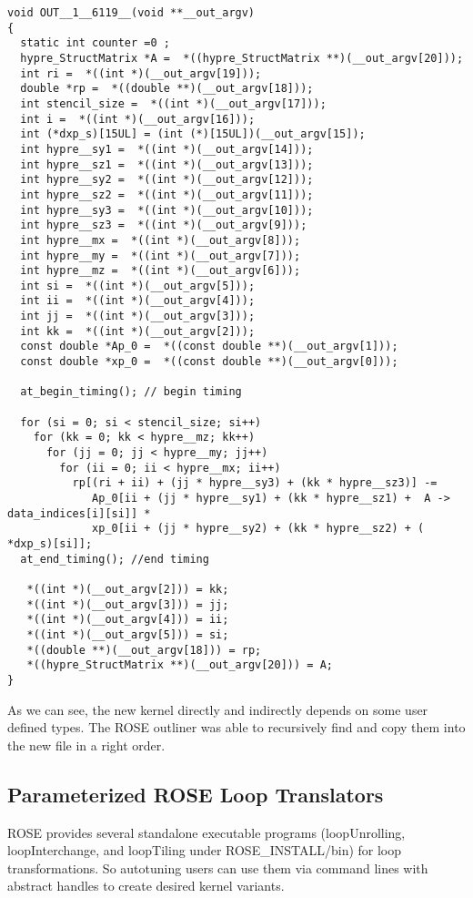 \begin{lstlisting}
void OUT__1__6119__(void **__out_argv)
{
  static int counter =0 ;
  hypre_StructMatrix *A =  *((hypre_StructMatrix **)(__out_argv[20]));
  int ri =  *((int *)(__out_argv[19]));
  double *rp =  *((double **)(__out_argv[18]));
  int stencil_size =  *((int *)(__out_argv[17]));
  int i =  *((int *)(__out_argv[16]));
  int (*dxp_s)[15UL] = (int (*)[15UL])(__out_argv[15]);
  int hypre__sy1 =  *((int *)(__out_argv[14]));
  int hypre__sz1 =  *((int *)(__out_argv[13]));
  int hypre__sy2 =  *((int *)(__out_argv[12]));
  int hypre__sz2 =  *((int *)(__out_argv[11]));
  int hypre__sy3 =  *((int *)(__out_argv[10]));
  int hypre__sz3 =  *((int *)(__out_argv[9]));
  int hypre__mx =  *((int *)(__out_argv[8]));
  int hypre__my =  *((int *)(__out_argv[7]));
  int hypre__mz =  *((int *)(__out_argv[6]));
  int si =  *((int *)(__out_argv[5]));
  int ii =  *((int *)(__out_argv[4]));
  int jj =  *((int *)(__out_argv[3]));
  int kk =  *((int *)(__out_argv[2]));
  const double *Ap_0 =  *((const double **)(__out_argv[1]));
  const double *xp_0 =  *((const double **)(__out_argv[0]));

  at_begin_timing(); // begin timing

  for (si = 0; si < stencil_size; si++)
    for (kk = 0; kk < hypre__mz; kk++)
      for (jj = 0; jj < hypre__my; jj++)
        for (ii = 0; ii < hypre__mx; ii++)
          rp[(ri + ii) + (jj * hypre__sy3) + (kk * hypre__sz3)] -= 
             Ap_0[ii + (jj * hypre__sy1) + (kk * hypre__sz1) +  A -> data_indices[i][si]] *
             xp_0[ii + (jj * hypre__sy2) + (kk * hypre__sz2) + ( *dxp_s)[si]];
  at_end_timing(); //end timing

   *((int *)(__out_argv[2])) = kk;
   *((int *)(__out_argv[3])) = jj;
   *((int *)(__out_argv[4])) = ii;
   *((int *)(__out_argv[5])) = si;
   *((double **)(__out_argv[18])) = rp;
   *((hypre_StructMatrix **)(__out_argv[20])) = A;
}

\end{lstlisting}

As we can see, the new kernel directly and indirectly depends on some user defined types. 
The ROSE outliner was able to recursively find and copy them into the new
file in a right order.
\subsection{Parameterized ROSE Loop Translators}
ROSE provides several standalone executable programs
(loopUnrolling, loopInterchange, and loopTiling under ROSE\_INSTALL/bin) for loop
transformations.
So autotuning users can use them via command
lines with abstract handles to create desired kernel variants.

